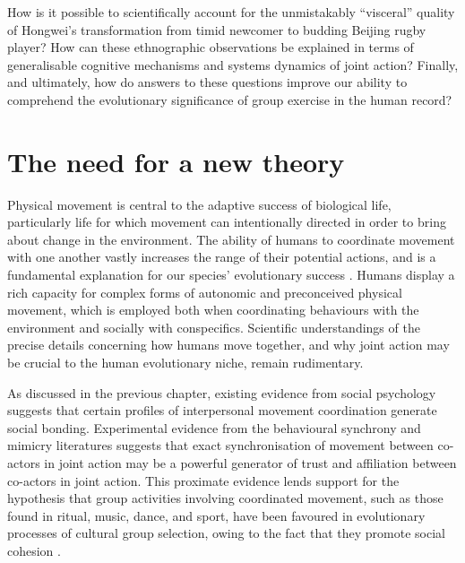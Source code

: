 \begin{CJK}{UTF8}{gbsn}
How is it possible to scientifically account for the unmistakably ``visceral'' quality of Hongwei's transformation from timid newcomer to budding Beijing rugby player?  How can these ethnographic observations be explained in terms of generalisable cognitive mechanisms and systems dynamics of joint action?  Finally, and ultimately, how do answers to these questions improve our ability to comprehend the evolutionary significance of group exercise in the human record?










\section{The need for a new theory}
Physical movement is central to the adaptive success of biological life, particularly life for which movement can intentionally directed in order to bring about change in the environment.  The ability of humans to coordinate movement with one another vastly increases the range of their potential actions, and is a fundamental explanation for our species' evolutionary success \citep{Tomasello2009}.  Humans display a rich capacity for complex forms of autonomic and preconceived physical movement, which is employed both when coordinating behaviours with the environment and socially with conspecifics. Scientific understandings of the precise details concerning how humans move together, and why joint action may be crucial to the human evolutionary niche, remain rudimentary.

As discussed in the previous chapter, existing evidence from social psychology suggests that certain profiles of interpersonal movement coordination generate social bonding.  Experimental evidence from the behavioural synchrony and mimicry literatures suggests that exact synchronisation of movement between co-actors in joint action may be a powerful generator of trust and affiliation between co-actors in joint action.  This proximate evidence lends support for the hypothesis that group activities involving coordinated movement, such as those found in ritual, music, dance, and sport, have been favoured in evolutionary processes of cultural group selection, owing to the fact that they promote social cohesion \cite{Dunbar2010}.


\end{CJK}
